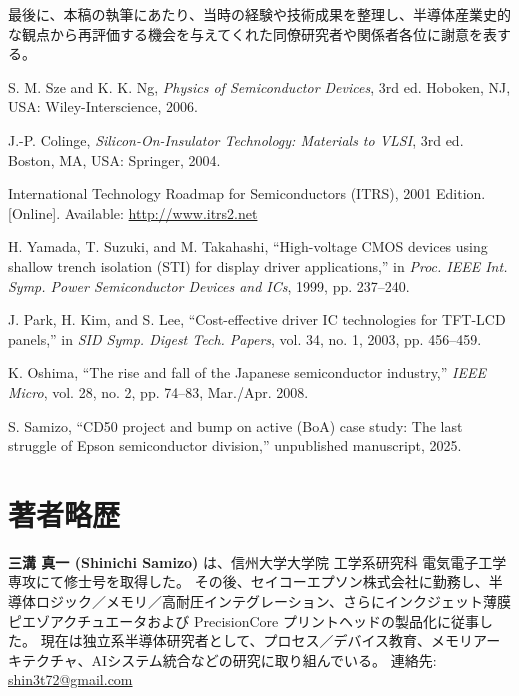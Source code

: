 \documentclass[conference]{IEEEtran}
\begin{document}
最後に、本稿の執筆にあたり、当時の経験や技術成果を整理し、半導体産業史的な観点から再評価する機会を与えてくれた同僚研究者や関係者各位に謝意を表する。

\begin{thebibliography}{99}

S. M. Sze and K. K. Ng, \textit{Physics of Semiconductor Devices}, 3rd ed. Hoboken, NJ, USA: Wiley-Interscience, 2006.

J.-P. Colinge, \textit{Silicon-On-Insulator Technology: Materials to VLSI}, 3rd ed. Boston, MA, USA: Springer, 2004.

International Technology Roadmap for Semiconductors (ITRS), 2001 Edition. [Online]. Available: \url{http://www.itrs2.net}

H. Yamada, T. Suzuki, and M. Takahashi, ``High-voltage CMOS devices using shallow trench isolation (STI) for display driver applications,'' in \textit{Proc. IEEE Int. Symp. Power Semiconductor Devices and ICs}, 1999, pp. 237--240.

J. Park, H. Kim, and S. Lee, ``Cost-effective driver IC technologies for TFT-LCD panels,'' in \textit{SID Symp. Digest Tech. Papers}, vol. 34, no. 1, 2003, pp. 456--459.

K. Oshima, ``The rise and fall of the Japanese semiconductor industry,'' \textit{IEEE Micro}, vol. 28, no. 2, pp. 74--83, Mar./Apr. 2008.

S. Samizo, ``CD50 project and bump on active (BoA) case study: The last struggle of Epson semiconductor division,'' unpublished manuscript, 2025.

\end{thebibliography}

\section*{著者略歴}
\textbf{三溝 真一 (Shinichi Samizo)} は、信州大学大学院 工学系研究科 電気電子工学専攻にて修士号を取得した。  
その後、セイコーエプソン株式会社に勤務し、半導体ロジック／メモリ／高耐圧インテグレーション、さらにインクジェット薄膜ピエゾアクチュエータおよび PrecisionCore プリントヘッドの製品化に従事した。  
現在は独立系半導体研究者として、プロセス／デバイス教育、メモリアーキテクチャ、AIシステム統合などの研究に取り組んでいる。  
連絡先: \href{mailto:shin3t72@gmail.com}{shin3t72@gmail.com}
\end{document}
